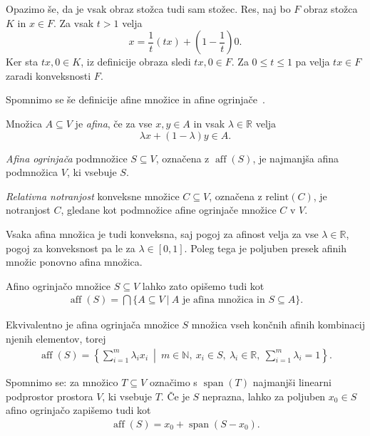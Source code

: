 \documentclass[mat2, tisk]{fmfdelo}
\newcommand{\R}{\mathbb{R}}
\newcommand{\N}{\mathbb{N}}
\begin{document}
Opazimo še, da je vsak obraz stožca tudi sam stožec.
Res, naj bo $F$ obraz stožca $K$ in $x\in F$.
Za vsak $t>1$ velja
\[
x=\frac1t(tx)+\left(1-\frac1t\right)0.
\]
Ker sta $tx,0\in K$, iz definicije obraza sledi
$tx,0\in F$. Za $0\leq t\leq1$ pa velja
$tx\in F$ zaradi konveksnosti $F$.

Spomnimo se še definicije afine množice in afine ogrinjače~\cite{rockafellar}.

\begin{definicija}
  Množica $A\subseteq V$ je \emph{afina}, če za vse $x,y\in A$ in vsak
  $\lambda\in\R$ velja
  \[
  \lambda x+(1-\lambda)y\in A.
  \]
\end{definicija}

\begin{definicija}
  \emph{Afina ogrinjača} podmnožice $S \subseteq V$, označena z
  $\operatorname{aff}(S)$, je najmanjša afina podmnožica $V$, ki vsebuje $S$.
\end{definicija}

\begin{definicija}
  \emph{Relativna notranjost} konveksne množice $C \subseteq V$, označena z $\mathrm{relint}(C)$, 
  je notranjost $C$, gledane kot podmnožice afine ogrinjače množice $C$ v $V$. 
\end{definicija} 

Vsaka afina množica je tudi konveksna, saj pogoj
za afinost velja za vse $\lambda\in\R$, pogoj
za konveksnost pa le za $\lambda\in[0,1]$.
Poleg tega je poljuben presek afinih množic
ponovno afina množica.

Afino ogrinjačo množice $S\subseteq V$ lahko zato
opišemo tudi kot
\begin{align*}
\operatorname{aff}(S)
=
\bigcap\{A\subseteq V ~|~ 
A\text{ je afina množica in }S\subseteq A\}.
\end{align*}

Ekvivalentno je afina ogrinjača množice $S$
množica vseh končnih afinih kombinacij njenih
elementov, torej
\begin{align*}
\operatorname{aff}(S)
=
\left\{
\sum_{i=1}^{m}\lambda_i x_i
~\middle|~
m\in\N,\ x_i\in S,\ \lambda_i\in\R,\
\sum_{i=1}^{m}\lambda_i=1
\right\}.
\end{align*}

Spomnimo se: za množico $T\subseteq V$ označimo s
$\operatorname{span}(T)$ najmanjši linearni
podprostor prostora $V$, ki vsebuje $T$.
Če je $S$ neprazna, lahko za poljuben
$x_0\in S$ afino ogrinjačo zapišemo tudi kot
\begin{align*}
\operatorname{aff}(S)
=x_0+\operatorname{span}(S-x_0).
\end{align*}
\end{document}
